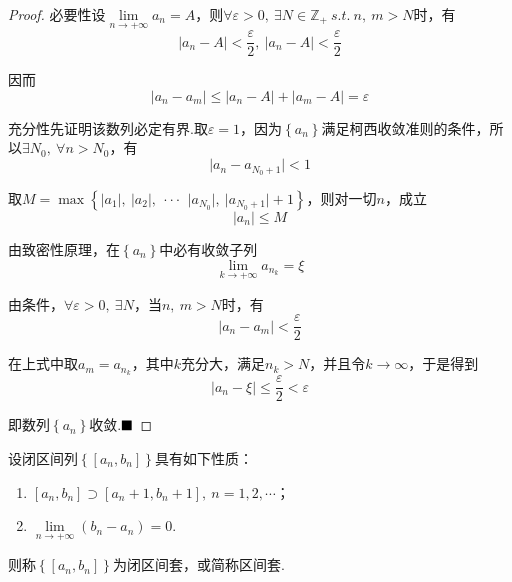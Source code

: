 \begin{proof}
	{\heiti 必要性}\qquad 设$\lim\limits_{n \to +\infty}a_n=A$，则$\forall \varepsilon>0,\ \exists N\in \mathbb{Z}_+\ s.t.\ n,\ m>N$时，有$$\lvert a_n-A\rvert <\frac{\varepsilon}{2},\ \lvert a_n-A\rvert <\frac{\varepsilon}{2}$$
	
	因而$$\lvert a_n-a_m\rvert \leqslant \lvert a_n-A\rvert + \lvert a_m-A\rvert=\varepsilon$$
	
	{\heiti 充分性}\qquad 先证明该数列必定有界.取$\varepsilon=1$，因为$\left\{a_n\right\}$满足柯西收敛准则的条件，所以$\exists N_0,\ \forall n>N_0$，有
	$$\lvert a_n-a_{N_0+1}\rvert <1$$
	
	取$M=\max\left\{\lvert a_1 \rvert,\ \lvert a_2 \rvert,\ \cdot\cdot\cdot\,\ \lvert a_{N_0} \rvert,\ \lvert a_{N_0+1} \rvert+1\right\}$，则对一切$n$，成立$$\lvert a_n \rvert\leqslant M$$
	
	由致密性原理，在$\left\{a_n\right\}$中必有收敛子列$$\lim_{k \to +\infty}a_{n_k}=\xi$$
	
	由条件，$\forall \varepsilon>0,\ \exists N$，当$n,\ m>N$时，有$$\lvert a_n-a_m\rvert <\frac{\varepsilon}{2}$$
	
	在上式中取$a_m=a_{n_k}$，其中$k$充分大，满足$n_k>N$，并且令$k \to \infty$，于是得到
	$$\lvert a_n-\xi \rvert\leqslant \frac{\varepsilon}{2}< \varepsilon $$
	
	即数列$\left\{a_n\right\}$收敛.$\hfill\blacksquare$
\end{proof}
\begin{definition}[闭区间套]
	设闭区间列$\left\{\left[a_n,b_n\right]\right\}$具有如下性质：
	\begin{enumerate}
		\item $\left[a_n,b_n\right]\supset \left[a_n+1,b_n+1\right],\ n=1,2,\cdots$；
		\item $\lim\limits_{n \to +\infty}(b_n-a_n)=0$.
	\end{enumerate}
	则称$\left\{\left[a_n,b_n\right]\right\}$为{\heiti 闭区间套}，或简称{\heiti 区间套}.
\end{definition}

